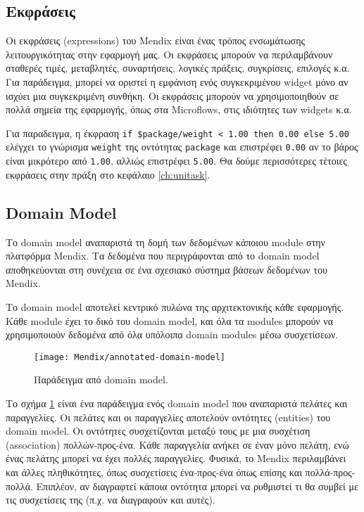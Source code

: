        \subsection{Εκφράσεις} \label{sec:MendixExpressions}
            Οι εκφράσεις (expressions) του Mendix είναι ένας τρόπος ενσωμάτωσης λειτουργικότητας στην εφαρμογή μας. Οι εκφράσεις μπορούν να περιλαμβάνουν σταθερές τιμές, μεταβλητές, συναρτήσεις, λογικές πράξεις, συγκρίσεις, επιλογές κ.α. Για παράδειγμα, μπορεί να οριστεί η εμφάνιση ενός συγκεκριμένου widget μόνο αν ισχύει μια συγκεκριμένη συνθήκη. Οι εκφράσεις μπορούν να χρησιμοποιηθούν σε πολλά σημεία της εφαρμογής, όπως στα Microflows, στις ιδιότητες των widgets κ.α.

            Για παραδειγμα, η έκφραση \verb|if $package/weight < 1.00 then 0.00 else 5.00| ελέγχει το γνώρισμα \texttt{weight} της οντότητας \texttt{package} και επιστρέφει \texttt{0.00} αν το βάρος είναι μικρότερο από \texttt{1.00}, αλλιώς επιστρέφει \texttt{5.00}. Θα δούμε περισσότερες τέτοιες εκφράσεις στην πράξη στο κεφάλαιο \ref{ch:unitask}.


        \subsection{Domain Model} \label{sec:MendixDomainModel}
            Το domain model αναπαριστά τη δομή των δεδομένων κάποιου module στην πλατφόρμα Mendix. Τα δεδομένα που περιγράφονται από το domain model αποθηκεύονται στη συνέχεια σε ένα σχεσιακό σύστημα βάσεων δεδομένων του Mendix.

            Το domain model αποτελεί κεντρικό πυλώνα της αρχιτεκτονικής κάθε εφαρμογής. Κάθε module έχει το δικό του domain model, και όλα τα modules μπορούν να χρησιμοποιούν δεδομένα από όλα υπόλοιπα domain modules μέσω συσχετίσεων.

            \begin{figure}[h!] \noindent \centering
                    \texttt{[image: Mendix/annotated-domain-model]}
                    \caption{\centering Παράδειγμα από domain model. \cite{mendixDoc}}
                    \label{fig:MendixDomainModel}
            \end{figure}

            Το σχήμα \ref{fig:MendixDomainModel} είναι ένα παράδειγμα ενός domain model που αναπαριστά πελάτες και παραγγελίες. Οι πελάτες και οι παραγγελίες αποτελούν οντότητες (entities) του domain model. Οι οντότητες συσχετίζονται μεταξύ τους με μια συσχέτιση (association) πολλών-προς-ένα. Κάθε παραγγελία ανήκει σε έναν μόνο πελάτη, ενώ ένας πελάτης μπορεί να έχει πολλές παραγγελίες. Φυσικά, το Mendix περιλαμβάνει και άλλες πληθικότητες, όπως συσχετίσεις ένα-προς-ένα όπως επίσης και πολλά-προς-πολλά. Επιπλέον, αν διαγραφτεί κάποια οντότητα μπορεί να ρυθμιστεί τι θα συμβεί με τις συσχετίσεις της (π.χ. να διαγραφούν και αυτές).

